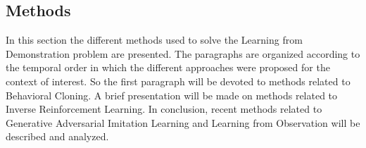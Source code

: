 \subsection{Methods}
In this section the different methods used to solve the Learning from Demonstration problem are presented. The paragraphs are organized according to the temporal order in which the different approaches were proposed for the context of interest. So the first paragraph will be devoted to methods related to Behavioral Cloning. A brief presentation will be made on methods related to Inverse Reinforcement Learning. In conclusion, recent methods related to Generative Adversarial Imitation Learning and Learning from Observation will be described and analyzed.
\label{sec:methods}




